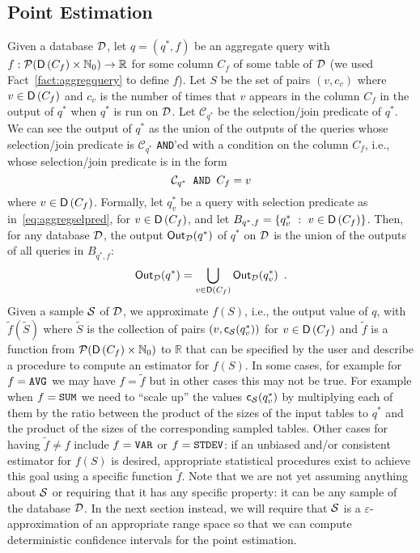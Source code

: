 \subsection{Point Estimation}\label{sec:pointest}
Given a database ${\cal D}$, let $q=(q^*,f)$ be an aggregate query with
$f:\mathcal{P}(\mathsf{D}\left(C_f\right)\times\mathbb{N}_0)\to\mathbb{R}$ for some column $C_f$ of some
table of ${\cal D}$ (we used Fact~\ref{fact:aggregquery} to define $f$). Let $S$ be the
set of pairs $(v,c_v)$ where $v\in \mathsf{D}\left(C_f\right)$ and $c_v$ is the number of times
that $v$ appears in the column $C_f$ in the output of $q^*$ when $q^*$ is run on
${\cal D}$. Let $\mathcal{C}_{q^*}$ be the selection/join predicate of $q^*$. We can
see the output of $q^*$ as the union of the outputs of the queries whose
selection/join predicate is $\mathcal{C}_{q^*}$
\texttt{AND}'ed with a condition on the column $C_f$, i.e., whose selection/join
predicate is in the form
\begin{equation}\label{eq:aggregselpred}
  \mathcal{C}_{q^*} \text{\texttt{ AND }} C_f=v
\end{equation}
where $v\in\mathsf{D}\left(C_f\right)$. Formally, let $q^*_v$ be a query with selection
predicate as in~\eqref{eq:aggregselpred}, for $v\in\mathsf{D}\left(C_f\right)$, and let
$B_{q^*,f}=\{q^*_v ~:~ v\in\mathsf{D}\left(C_f\right)\}$. Then, for any database ${\cal D}$, the
output $\mathsf{Out}_{\cal D}(q^*)$ of $q^*$ on ${\cal D}$ is the union of the outputs of all
queries in $B_{q^*,f}$:
\[ \mathsf{Out}_{\cal D}(q^*)=\bigcup_{v\in\mathsf{D}\left(C_f\right)}\mathsf{Out}_{\cal D}(q^*_v)\enspace.
\]
Given a sample ${\cal S}$ of ${\cal D}$, we approximate $f(S)$, i.e., the output value of $q$,
with $\tilde f(\tilde S)$ where $\tilde S$ is the collection of pairs
$(v,\mathsf{c}_{\cal S}(q^*_v))$ for $v\in\mathsf{D}\left(C_f\right)$ and $\tilde f$ is a function from
$\mathcal{P}(\mathsf{D}\left(C_f\right)\times\mathbb{N}_0)$ to $\mathbb{R}$ that can be
specified by the user and describe a procedure to compute an estimator for
$f(S)$. In some cases, for example for $f=\text{\texttt{AVG}}$ we may have
$f=\tilde f$ but in other cases this may not
be true. For example when $f=\text{\texttt{SUM}}$ we need to ``scale up'' the
values $\mathsf{c}_{\cal S}(q^*_v)$ by multiplying each of them by the ratio between the
product of the sizes of the input tables to $q^*$ and the product of the sizes
of the corresponding sampled tables. Other cases for having $\tilde f\neq f$
include $f=\text{\texttt{VAR}}$ or $f=\text{\texttt{STDEV}}$: if an unbiased
and/or consistent estimator for $f(S)$ is desired, appropriate statistical
procedures exist to achieve this goal using a specific function $\tilde f$.
Note that we are not yet assuming anything about ${\cal S}$ or requiring that it has
any specific property: it can be any sample of the database ${\cal D}$. In the next
section instead, we will require that ${\cal S}$ is a $\varepsilon$-approximation of
an appropriate range space so that we can compute deterministic confidence
intervals for the point estimation.

